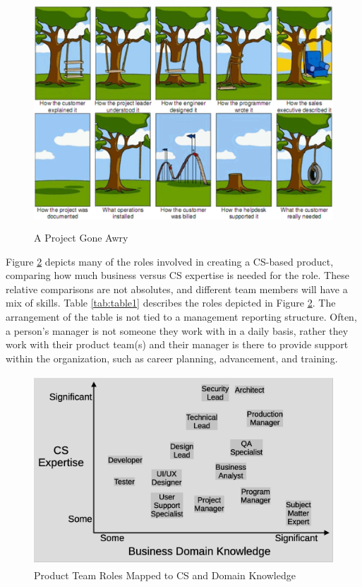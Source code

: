 \begin{figure}[!htb]
	\begin{center}
		\caption{A Project Gone Awry}
		\label{fig:figure1}
		\vskip 4pt
		\includegraphics[height=3.4in]{figs2/tree-swing-requirements-issue.png}
	\end{center}
\end{figure}

\vspace{10pt}

Figure \ref{fig:figure2} depicts many of the roles involved in creating a CS-based product, comparing how much business versus CS expertise is needed for the role. These relative comparisons are not absolutes, and different team members will have a mix of skills. Table \ref{tab:table1} describes the roles depicted in Figure \ref{fig:figure2}. The arrangement of the table is not tied to a management reporting structure. Often, a person's manager is not someone they work with in a daily basis, rather they work with their product team(s) and their manager is there to provide support within the organization, such as career planning, advancement, and training.

\begin{figure}[!htb]
	\begin{center}
		\caption{Product Team Roles Mapped to CS and Domain Knowledge}
		\label{fig:figure2}
		\vskip 4pt
		\includegraphics[height=2.8in]{figs2/cs-team-roles-knowledge-area.eps}
	\end{center}
\end{figure}


